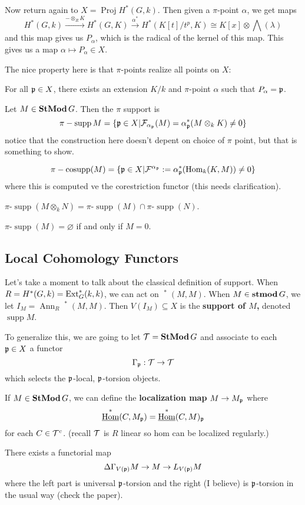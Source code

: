 \documentclass[12pt]{article}
\newcommand{\p}{\frakp}
\DeclareMathOperator{\supp}{supp}
\DeclareMathOperator{\uHom}{\underline{Hom}}
\begin{document}
Now return again to $X=\operatorname{Proj}H^\ast(G,k)$. Then given a $\pi$-point $\alpha$, we get maps 
\[H^\ast(G,k)\xrightarrow{-\otimes_R K}H^\ast(G,K)\xrightarrow{\alpha^\ast}H^\ast(K[t]/t^p,K)\cong K[x]\otimes\bigwedge(\lambda)\]
and this map gives us $P_\alpha$, which is the radical of the kernel of this map. This gives us a map $\alpha\mapsto P_\alpha\in X$.

The nice property here is that $\pi$-points realize all points on $X$:
\begin{thm}
	For all $\p\in X$, there exists an extension $K/k$ and $\pi$-point $\alpha$ such that $P_\alpha=\p$.
\end{thm}

\begin{defn}
	Let $M\in\operatorname{\mathbf{StMod}} G$. Then the $\pi$ support is 
	\[\pi-\supp M=\{\p\in X|\calF_{\alpha_\p}(M)=\alpha^\ast_\p(M\otimes_k K)\ne 0\}\]
	notice that the construction here doesn't depent on choice of $\pi$ point, but that is something to show.
\end{defn}
\begin{defn}
	\[\pi-\operatorname{cosupp}(M)=\{\p\in X|\calF^{\alpha_\p}:=\alpha_\p^\ast(\Hom_k(K,M))\ne 0\}\]
	where this is computed ve the corestriction functor (this needs clarification).
\end{defn}
\begin{thm}
	$\pi$-$\supp(M\otimes_k N)=\pi$-$\supp(M)\cap\pi$-$\supp(N)$.
\end{thm}
\begin{thm}[BKIP `18]
	$\pi$-$\supp(M)=\varnothing$ if and only if $M=0$.
\end{thm}

\subsection{Local Cohomology Functors}
Let's take a moment to talk about the classical definition of support. When $R=H^\ast(G,k)=\operatorname{Ext}^\ast_G(k,k)$, we can act on 
$\uHom^\ast(M,M)$. When $M\in\operatorname{\mathbf{stmod}} G$, we let $I_M=\operatorname{Ann}_R\uHom^\ast(M,M)$. Then $V(I_M)\subseteq X$ is the \textbf{support of 
$M$,} denoted $\supp M$.

To generalize this, we are going to let $\mathcal{T}=\operatorname{\mathbf{StMod}} G$ and associate to each $\p\in X$ a functor 
\[\Gamma_\p:\calT\to\calT\]
which selects the $\p$-local, $\p$-torsion objects.
\begin{defn}
	If $M\in\operatorname{\mathbf{StMod}} G$, we can define the \textbf{localization map} $M\to M_\p$ where 
	\[\uHom^\ast(C,M_\p)=\uHom^\ast(C,M)_\p\]
	for each $C\in\mathcal{T}^c$. (recall $\mathcal{T}$ is $R$ linear so hom can be localized regularly.)
\end{defn}
\begin{defn}
	There exists a functorial map 
	\[\Delta\Gamma_{V(\p)}M\to M\to L_{V(\p)}M\]
	where the left part is universal $\p$-torsion and the right (I believe) is $\p$-torsion in the usual way (check the paper).
\end{defn}
\end{document}
